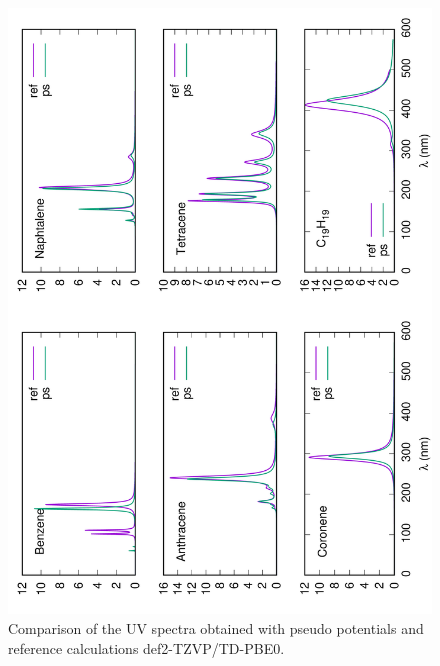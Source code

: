 \documentclass[12pt]{article}
\begin{document}
\begin{figure}
\begin{center}
\includegraphics[width=12cm,angle=270]{cnhn_uv}
\end{center}
\vspace{0.25in}
\hspace*{3in}
\caption{Comparison of the UV spectra obtained with pseudo potentials and reference
calculations def2-TZVP/TD-PBE0.}
\label{fig:cnhn_uv}
\end{figure}

\end{document}
